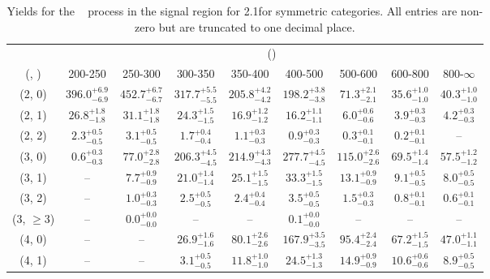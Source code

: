\begin{table}[h!]
\tiny
\centering
\caption{Yields for the \zInv~ process in the signal region for 2.1\ifb for symmetric categories. All entries are non-zero but are truncated to one decimal place.\label{tab:yieldssep_sig_zinv_sym}}
\begin{tabular}
{ccccccccc}
	\hline\hline
	& \multicolumn{8}{c}{\scalht (\gev)} \\ 
	 (\njet,  \nb) & 200-250 & 250-300 & 300-350 & 350-400 & 400-500 & 500-600 & 600-800 & 800-$\infty$ \\ [0.8ex] 
\hline
	(2, 0) & $396.0^{+ 6.9 }_{- 6.9 }$ & $452.7^{+ 6.7 }_{- 6.7 }$ & $317.7^{+ 5.5 }_{- 5.5 }$ & $205.8^{+ 4.2 }_{- 4.2 }$ & $198.2^{+ 3.8 }_{- 3.8 }$ & $71.3^{+ 2.1 }_{- 2.1 }$ & $35.6^{+ 1.0 }_{- 1.0 }$ & $40.3^{+ 1.0 }_{- 1.0 }$ \\[0.5ex] 
	(2, 1) & $26.8^{+ 1.8 }_{- 1.8 }$ & $31.1^{+ 1.8 }_{- 1.8 }$ & $24.3^{+ 1.5 }_{- 1.5 }$ & $16.9^{+ 1.2 }_{- 1.2 }$ & $16.2^{+ 1.1 }_{- 1.1 }$ & $6.0^{+ 0.6 }_{- 0.6 }$ & $3.9^{+ 0.3 }_{- 0.3 }$ & $4.2^{+ 0.3 }_{- 0.3 }$ \\[0.5ex] 
	(2, 2) & $2.3^{+ 0.5 }_{- 0.5 }$ & $3.1^{+ 0.5 }_{- 0.5 }$ & $1.7^{+ 0.4 }_{- 0.4 }$ & $1.1^{+ 0.3 }_{- 0.3 }$ & $0.9^{+ 0.3 }_{- 0.3 }$ & $0.3^{+ 0.1 }_{- 0.1 }$ & $0.2^{+ 0.1 }_{- 0.1 }$ & -- \\[0.5ex] 
	(3, 0) & $0.6^{+ 0.3 }_{- 0.3 }$ & $77.0^{+ 2.8 }_{- 2.8 }$ & $206.3^{+ 4.5 }_{- 4.5 }$ & $214.9^{+ 4.3 }_{- 4.3 }$ & $277.7^{+ 4.5 }_{- 4.5 }$ & $115.0^{+ 2.6 }_{- 2.6 }$ & $69.5^{+ 1.4 }_{- 1.4 }$ & $57.5^{+ 1.2 }_{- 1.2 }$ \\[0.5ex] 
	(3, 1) & -- & $7.7^{+ 0.9 }_{- 0.9 }$ & $21.0^{+ 1.4 }_{- 1.4 }$ & $25.1^{+ 1.5 }_{- 1.5 }$ & $33.3^{+ 1.5 }_{- 1.5 }$ & $13.1^{+ 0.9 }_{- 0.9 }$ & $9.1^{+ 0.5 }_{- 0.5 }$ & $8.0^{+ 0.5 }_{- 0.5 }$ \\[0.5ex] 
	(3, 2) & -- & $1.0^{+ 0.3 }_{- 0.3 }$ & $2.5^{+ 0.5 }_{- 0.5 }$ & $2.4^{+ 0.4 }_{- 0.4 }$ & $3.5^{+ 0.5 }_{- 0.5 }$ & $1.5^{+ 0.3 }_{- 0.3 }$ & $0.8^{+ 0.1 }_{- 0.1 }$ & $0.6^{+ 0.1 }_{- 0.1 }$ \\[0.5ex] 
	(3, $\ge3$) & -- & $0.0^{+ 0.0 }_{- 0.0 }$ & -- & -- & $0.1^{+ 0.0 }_{- 0.0 }$ & -- & -- & -- \\[0.5ex] 
	(4, 0) & -- & -- & $26.9^{+ 1.6 }_{- 1.6 }$ & $80.1^{+ 2.6 }_{- 2.6 }$ & $167.9^{+ 3.5 }_{- 3.5 }$ & $95.4^{+ 2.4 }_{- 2.4 }$ & $67.2^{+ 1.5 }_{- 1.5 }$ & $47.0^{+ 1.1 }_{- 1.1 }$ \\[0.5ex] 
	(4, 1) & -- & -- & $3.1^{+ 0.5 }_{- 0.5 }$ & $11.8^{+ 1.0 }_{- 1.0 }$ & $24.5^{+ 1.3 }_{- 1.3 }$ & $14.9^{+ 0.9 }_{- 0.9 }$ & $10.6^{+ 0.6 }_{- 0.6 }$ & $8.9^{+ 0.5 }_{- 0.5 }$ \\[0.5ex] 

\end{tabular}
\end{table}
